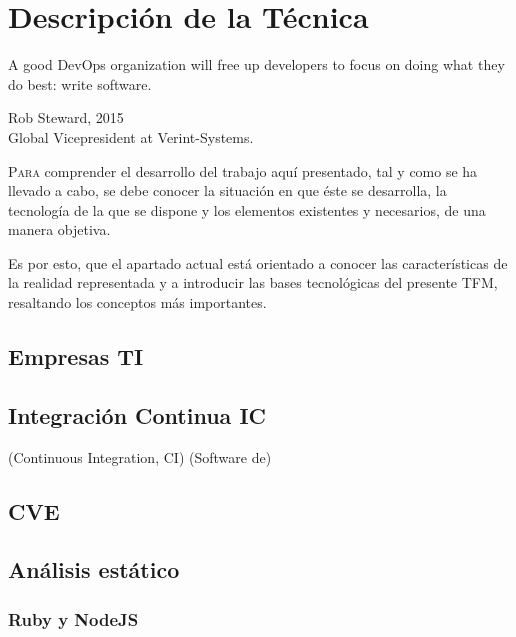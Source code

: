 \chapter{Descripción de la Técnica}\label{chp-02}
\epigraph{A good DevOps organization will free up developers to focus on doing what they do best: write software. }{Rob Steward, 2015\\Global Vicepresident at Verint-Systems.}

\lettrine[lraise=-0.1, lines=2, loversize=0.2]{P}{ara} comprender el desarrollo del trabajo aquí presentado, tal y como se ha llevado a cabo, se debe conocer la situación en que éste se desarrolla, la tecnología de la que se dispone y los elementos existentes y necesarios, de una manera objetiva.

Es por esto, que el apartado actual está orientado a conocer las características de la realidad representada y a introducir las bases tecnológicas del presente \gls{TFM}, resaltando los conceptos más importantes.

\section{Empresas \gls{TI}}


\section{Integración Continua \gls{IC}}

(Continuous Integration, \gls{CI})
(Software de) 

\section{CVE}


\section{Análisis estático}



\subsection{Ruby y NodeJS}

